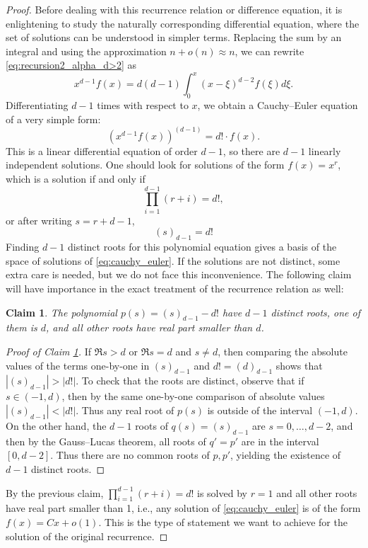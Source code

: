 \documentclass[11pt]{article}
\newtheorem{claim}[theorem]{Claim}
\theoremstyle{definition}
\begin{document}
\begin{proof}
    Before dealing with this recurrence relation or difference equation, it is enlightening to study the naturally corresponding differential equation, where the set of solutions can be understood in simpler terms. Replacing the sum by an integral and using the approximation $n+o(n)\approx n$, we can rewrite \eqref{eq:recursion2_alpha_d>2} as
    $$x^{d-1}f(x)=d(d-1)\int_{0}^{x}(x-\xi)^{d-2}f(\xi)d\xi.$$
    Differentiating $d-1$ times with respect to $x$, we obtain a Cauchy--Euler equation of a very simple form:
    \begin{equation}\label{eq:cauchy_euler}
    \left(x^{d-1}f(x)\right)^{(d-1)}=d! \cdot f(x).
    \end{equation}
    This is a linear differential equation of order $d-1$, so there are $d-1$ linearly independent solutions. One should look for solutions of the form $f(x)=x^r$, which is a solution if and only if
    $$\prod_{i=1}^{d-1}(r+i)=d!,$$
    or after writing $s=r+d-1$,
    $$(s)_{d-1}=d!$$
    Finding $d-1$ distinct roots for this polynomial equation gives a basis of the space of solutions of \eqref{eq:cauchy_euler}. If the solutions are not distinct, some extra care is needed, but we do not face this inconvenience. The following claim will have importance in the exact treatment of the recurrence relation as well:

    \begin{claim}\label{claim:falling_factorial_roots}
    The polynomial $p(s)=(s)_{d-1}-d!$ have $d-1$ distinct roots, one of them is $d$, and all other roots have real part smaller than $d$.
    \end{claim}

    \begin{proof}[Proof of Claim \ref{claim:falling_factorial_roots}]
        If $\Re s>d$ or $\Re s = d$ and $s\neq d$, then comparing the absolute values of the terms one-by-one in $(s)_{d-1}$ and $d!=(d)_{d-1}$ shows that $|(s)_{d-1}|>|d!|$. To check that the roots are distinct, observe that if $s\in (-1, d)$, then by the same one-by-one comparison of absolute values $|(s)_{d-1}|<|d!|$. Thus any real root of $p(s)$ is outside of the interval $(-1, d)$. On the other hand, the $d-1$ roots of $q(s)=(s)_{d-1}$ are $s=0, \dots, d-2$, and then by the Gauss--Lucas theorem, all roots of $q'=p'$ are in the interval $[0, d-2]$. Thus there are no common roots of $p, p'$, yielding the existence of $d-1$ distinct roots.
    \end{proof}

    By the previous claim, $\prod_{i=1}^{d-1}(r+i)=d!$ is solved by $r=1$ and all other roots have real part smaller than 1, i.e., any solution of \eqref{eq:cauchy_euler} is of the form $f(x)=Cx+o(1)$. This is the type of statement we want to achieve for the solution of the original recurrence.


\end{proof}
\end{document}
